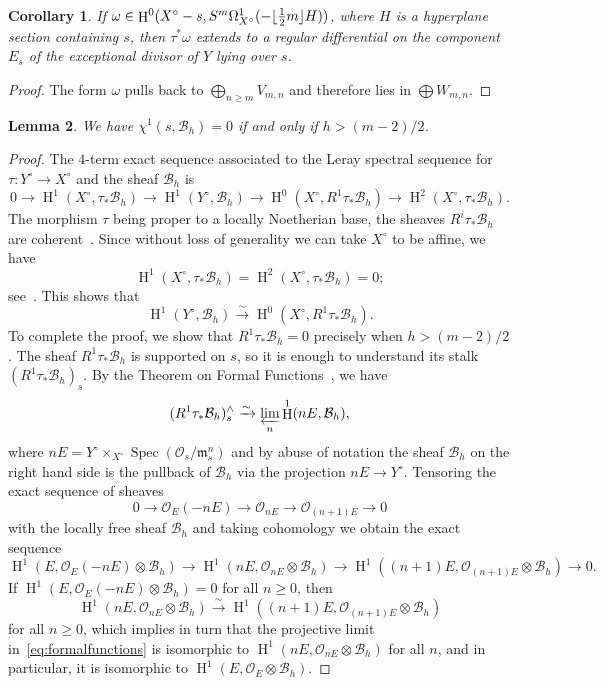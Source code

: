 \documentclass[12pt, reqno]{amsart}
\DeclarePairedDelimiter{\floor}{\lfloor}{\rfloor}
\newtheorem{lemma}{Lemma}[section]
\newtheorem{cor}[lemma]{Corollary}
\theoremstyle{definition}
\newcommand{\calB}{{\mathcal B}}
\newcommand{\calO}{{\mathcal O}}
\newcommand{\frakm}{{\mathfrak m}}
\DeclareMathOperator{\HH}{H}
\DeclareMathOperator{\Spec}{Spec}
\numberwithin{equation}{section}
\numberwithin{table}{section}
\begin{document}
\begin{cor}\label{C:vanishing_on_hyperplane} If $\omega\in \HH^0(X^\circ-s,S^m\Omega^1_{X^\circ}(-\floor{\frac{1}{2}m} H))$, where $H$ is a hyperplane section containing $s$, then $\tau^*\omega$ extends to a regular differential on the component $E_s$ of the exceptional divisor of $Y$ lying over $s$.
\end{cor}
\begin{proof}
The form $\omega$ pulls back to $\bigoplus_{n\geq m} V_{m,n}$ and therefore lies in $\bigoplus W_{m,n}$.
\end{proof}

\begin{lemma}\label{L:chi1B} We have $\chi^1(s,\calB_h)=0$ if and only if $h>(m-2)/2$.
\end{lemma}
\begin{proof}
The $4$-term exact sequence associated to the Leray spectral sequence for $\tau\colon Y^\circ \to X^\circ$ and the sheaf $\calB_h$ is
\[
0 \to \HH^1(X^\circ,\tau_*\calB_h) \to \HH^1(Y^\circ,\calB_h) \to \HH^0(X^\circ,R^1\tau_*\calB_h) \to \HH^2(X^\circ,\tau_*\calB_h).
\]
The morphism $\tau$ being proper to a locally Noetherian base, the sheaves $R^i\tau_*\calB_h$
 are coherent~\cite[III.1~Th\'eor\`eme 3.2.1]{EGAIII}. Since without loss of generality we can take $X^\circ$ to be affine, we have
 \[
\HH^1(X^\circ,\tau_*\calB_h) = \HH^2(X^\circ,\tau_*\calB_h) = 0;
 \]
 see~\cite[III.3.5]{Hartshorne}. This shows that
 \[
\HH^1(Y^\circ,\calB_h) \xrightarrow{\sim} \HH^0(X^\circ,R^1\tau_*\calB_h).
 \]
To complete the proof, we show that $R^1\tau_*\calB_h = 0$ precisely when $h > (m-2)/2$. The sheaf $R^1\tau_*\calB_h$ is supported on $s$, so it is enough to understand its stalk $(R^1\tau_*\calB_h)_s$. By the Theorem on Formal Functions~\cite[III.11.1]{Hartshorne}, we have
\begin{equation}
\label{eq:formalfunctions}
(R^1\tau_*\calB_h)^{\wedge}_s \xrightarrow{\sim} \varprojlim_n \HH^1(nE,\calB_h),
\end{equation}
where $nE = Y^\circ\times_{X^\circ} \Spec(\calO_s/\frakm_s^n)$ and by abuse of notation the sheaf $\calB_h$ on the right hand side is the pullback of $\calB_h$ via the projection $nE \to Y^\circ$. Tensoring the exact sequence of sheaves \[
0 \to \calO_E(-nE) \to \calO_{nE} \to \calO_{(n+1)E} \to 0
\]
with the locally free sheaf $\calB_h$ and taking cohomology we obtain the exact sequence
\[
\HH^1(E,\calO_E(-nE)\otimes\calB_h) \to \HH^1(nE,\calO_{nE}\otimes \calB_h) \to \HH^1((n+1)E,\calO_{(n+1)E}\otimes\calB_h) \to 0.
\]
If $\HH^1(E,\calO_E(-nE)\otimes\calB_h) = 0$ for all $n \geq 0$, then
\[
\HH^1(nE,\calO_{nE}\otimes \calB_h) \xrightarrow{\sim} \HH^1((n+1)E,\calO_{(n+1)E}\otimes\calB_h)
\]
for all $n\geq 0$, which implies in turn that the projective limit in~\eqref{eq:formalfunctions} is isomorphic to $\HH^1(nE,\calO_{nE}\otimes \calB_h)$ for all $n$, and in particular, it is isomorphic to $\HH^1(E,\calO_{E}\otimes \calB_h)$.


\end{proof}
\end{document}
